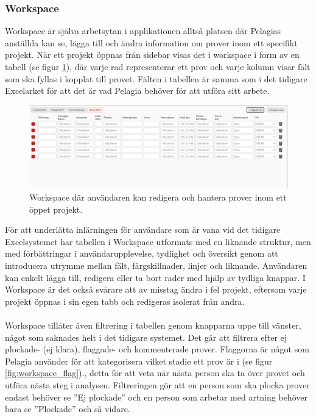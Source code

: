 \subsubsection{Workspace}

Workspace är själva arbetsytan i applikationen alltså platsen där Pelagias anställda kan se, lägga till och ändra information om prover inom ett specifikt projekt.
När ett projekt öppnas från sidebar visas det i workspace i form av en tabell (se figur \ref{fig:workspace}), där varje rad representerar ett prov och varje kolumn visar fält som ska fyllas i kopplat till provet. Fälten i tabellen är samma som i det tidigare Excelarket för att det är vad Pelagia behöver för att utföra sitt arbete.
\begin{figure}[H]
    \centering
    \includegraphics[width=1\linewidth]{images/workspace.PNG}
    \caption{Workspace där användaren kan redigera och hantera prover inom ett öppet projekt.}
    \label{fig:workspace}
\end{figure}
\noindent För att underlätta inlärningen för användare som är vana vid det tidigare Excelsystemet har tabellen i Workspace utformats med en liknande struktur, men med förbättringar i användarupplevelse, tydlighet och översikt genom att introducera utrymme mellan fält, färgskillnader, linjer och liknande. 
Användaren kan enkelt lägga till, redigera eller ta bort rader med hjälp av tydliga knappar. I Workspace är det också svårare att av misstag ändra i fel projekt, eftersom varje projekt öppnas i sin egen tabb och redigeras isolerat från andra.
\\\\
Workspace tillåter även filtrering i tabellen genom knapparna uppe till vänster, något som saknades helt i det tidigare systemet. Det går att filtrera efter ej plockade- (ej klara), flaggade- och kommenterade prover.
Flaggorna är något som Pelagia använder för att kategorisera vilket stadie ett prov är i (se figur \ref{fig:workspace_flag})., detta för att veta när nästa person ska ta över provet och utföra nästa steg i analysen. Filtreringen gör att en person som ska plocka prover endast behöver se ''Ej plockade'' och en person som arbetar med artning behöver bara se ''Plockade'' och så vidare.

